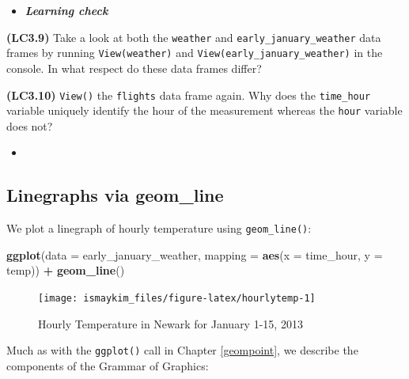 \documentclass[12pt,]{krantz}
\makeatletter
\newenvironment{Shaded}{\begin{snugshade}}{\end{snugshade}}
\newcommand{\KeywordTok}[1]{\textcolor[rgb]{0.27,0.27,0.27}{\textbf{#1}}}
\newcommand{\DataTypeTok}[1]{\textcolor[rgb]{0.27,0.27,0.27}{#1}}
\newcommand{\StringTok}[1]{\textcolor[rgb]{0.5,0.5,0.5}{#1}}
\newcommand{\OperatorTok}[1]{\textcolor[rgb]{0.43,0.43,0.43}{\textbf{#1}}}
\newcommand{\NormalTok}[1]{#1}
\newenvironment{kframe}{%
\medskip{}
\setlength{\fboxsep}{.8em}
 \def\at@end@of@kframe{}%
 \ifinner\ifhmode%
  \def\at@end@of@kframe{\end{minipage}}%
  \begin{minipage}{\columnwidth}%
 \fi\fi%
 \def\FrameCommand##1{\hskip\@totalleftmargin \hskip-\fboxsep
 \colorbox{shadecolor}{##1}\hskip-\fboxsep
     \hskip-\linewidth \hskip-\@totalleftmargin \hskip\columnwidth}%
 \MakeFramed {\advance\hsize-\width
   \@totalleftmargin\z@ \linewidth\hsize
   \@setminipage}}%
 {\par\unskip\endMakeFramed%
 \at@end@of@kframe}
\renewenvironment{Shaded}{\begin{kframe}}{\end{kframe}}
\newenvironment{rmdblock}[1]
  {\begin{shaded*}
  \begin{itemize}
  \renewcommand{\labelitemi}{
    \raisebox{-.7\height}[0pt][0pt]{
    }
  }
  \item
  }
  {
  \end{itemize}
  \end{shaded*}
  }
\newenvironment{learncheck}
  {\begin{rmdblock}{warning}}
  {\end{rmdblock}}
\makeatother
\begin{document}
\begin{learncheck}
\textbf{\emph{Learning check}}
\end{learncheck}

\textbf{(LC3.9)} Take a look at both the \texttt{weather} and
\texttt{early\_january\_weather} data frames by running
\texttt{View(weather)} and \texttt{View(early\_january\_weather)} in the
console. In what respect do these data frames differ?

\textbf{(LC3.10)} \texttt{View()} the \texttt{flights} data frame again.
Why does the \texttt{time\_hour} variable uniquely identify the hour of
the measurement whereas the \texttt{hour} variable does not?

\begin{learncheck}

\end{learncheck}

\subsection{Linegraphs via geom\_line}\label{geomline}

We plot a linegraph of hourly temperature using \texttt{geom\_line()}:

\begin{Shaded}
\begin{Highlighting}[]
\KeywordTok{ggplot}\NormalTok{(}\DataTypeTok{data =}\NormalTok{ early_january_weather, }
       \DataTypeTok{mapping =} \KeywordTok{aes}\NormalTok{(}\DataTypeTok{x =}\NormalTok{ time_hour, }\DataTypeTok{y =}\NormalTok{ temp)) }\OperatorTok{+}
\StringTok{  }\KeywordTok{geom_line}\NormalTok{()}
\end{Highlighting}
\end{Shaded}

\begin{figure}

{\centering \texttt{[image: ismaykim\_files/figure-latex/hourlytemp-1]} 

}

\caption{Hourly Temperature in Newark for January 1-15, 2013}\label{fig:hourlytemp}
\end{figure}

Much as with the \texttt{ggplot()} call in Chapter \ref{geompoint}, we
describe the components of the Grammar of Graphics:
\end{document}
